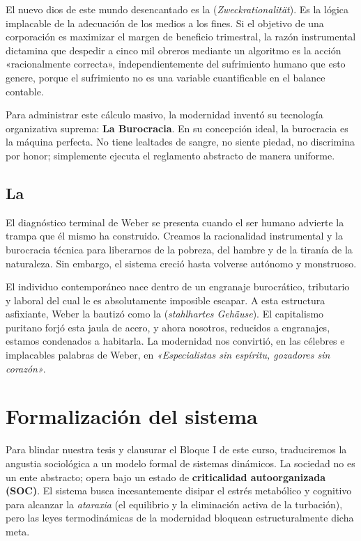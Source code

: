 El nuevo dios de este mundo desencantado es la \textbf{\RacionalidadInstrumental} (\textit{Zweckrationalität}). Es la lógica implacable de la adecuación de los medios a los fines. Si el objetivo de una corporación es maximizar el margen de beneficio trimestral, la razón instrumental dictamina que despedir a cinco mil obreros mediante un algoritmo es la acción «racionalmente correcta», independientemente del sufrimiento humano que esto genere, porque el sufrimiento no es una variable cuantificable en el balance contable.

Para administrar este cálculo masivo, la modernidad inventó su tecnología organizativa suprema: \textbf{La Burocracia}. En su concepción ideal, la burocracia es la máquina perfecta. No tiene lealtades de sangre, no siente piedad, no discrimina por honor; simplemente ejecuta el reglamento abstracto de manera uniforme. 

\subsection{La \JaulaDeHierro}

El diagnóstico terminal de Weber se presenta cuando el ser humano advierte la trampa que él mismo ha construido. Creamos la racionalidad instrumental y la burocracia técnica para liberarnos de la pobreza, del hambre y de la tiranía de la naturaleza. Sin embargo, el sistema creció hasta volverse autónomo y monstruoso. 

El individuo contemporáneo nace dentro de un engranaje burocrático, tributario y laboral del cual le es absolutamente imposible escapar. A esta estructura asfixiante, Weber la bautizó como la \textbf{\JaulaDeHierro} (\textit{stahlhartes Gehäuse}). El capitalismo puritano forjó esta jaula de acero, y ahora nosotros, reducidos a engranajes, estamos condenados a habitarla. La modernidad nos convirtió, en las célebres e implacables palabras de Weber, en \textit{«Especialistas sin espíritu, gozadores sin corazón»}.

\section{Formalización del sistema}
\label{sec:lab_vinculo_social}

Para blindar nuestra tesis y clausurar el Bloque I de este curso, traduciremos la angustia sociológica a un modelo formal de sistemas dinámicos. La sociedad no es un ente abstracto; opera bajo un estado de \textbf{criticalidad autoorganizada (SOC)}. El sistema busca incesantemente disipar el estrés metabólico y cognitivo para alcanzar la \textit{ataraxia} (el equilibrio y la eliminación activa de la turbación), pero las leyes termodinámicas de la modernidad bloquean estructuralmente dicha meta.

